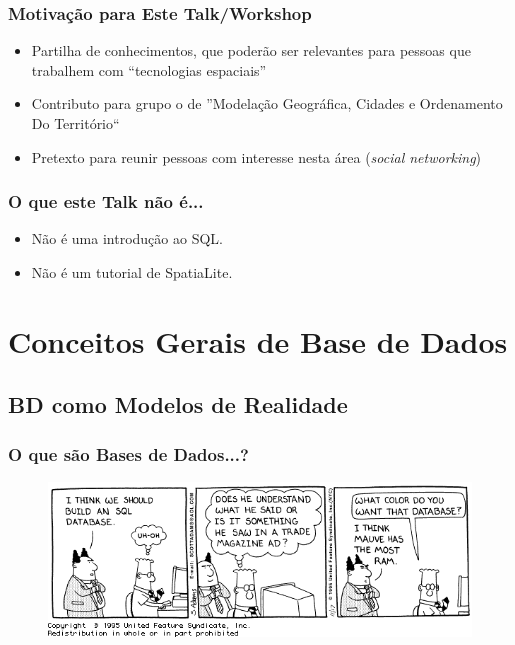 \documentclass[hyperref={pdfpagelabels=true}]{beamer}
\begin{document}
\begin{frame}
\frametitle{Motiva\c{c}\~{a}o para Este Talk/Workshop}
    \begin{itemize}
      \item<2-> Partilha de conhecimentos, que poder\~{a}o ser relevantes para pessoas que trabalhem com ``tecnologias espaciais''
      \item<3-> Contributo para grupo o de ''Modela\c{c}\~{a}o Geogr\'{a}fica, Cidades e Ordenamento Do Territ\'{o}rio``
      \item<4-> Pretexto para reunir pessoas com interesse nesta \'{a}rea (\textit{social networking})
      \end{itemize}
\end{frame}

\begin{frame}
\frametitle{O que este Talk n\~{a}o \'{e}...}
    \begin{itemize}
      \item<2-> N\~{a}o  \'{e} uma introdu\c{c}\~{a}o ao SQL.
      \item<3-> N\~{a}o  \'{e} um tutorial de SpatiaLite.
      \end{itemize}
\end{frame}

\section{Conceitos Gerais de Base de Dados}
\subsection{BD como Modelos de Realidade}
\begin{frame}
\frametitle{O que s\~{a}o Bases de Dados...?}
\begin{overprint}
\begin{figure}
\includegraphics[scale=0.4]{dilbert_db.png}
\end{figure}
\end{overprint}
\end{frame}
\end{document}
